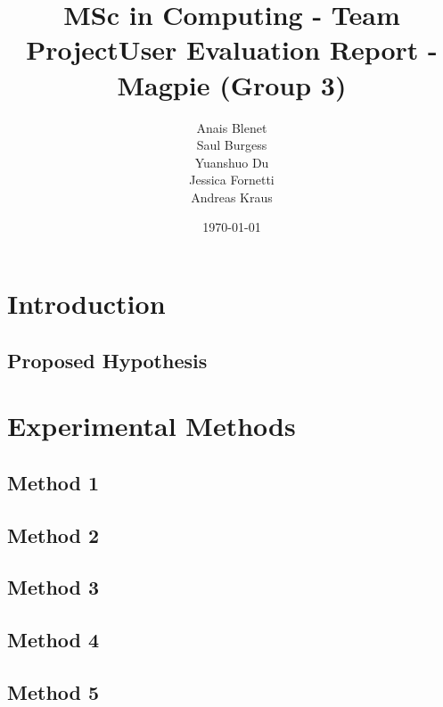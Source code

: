\documentclass{report}
\begin{document}
\title{MSc in Computing - Team Project}
\title{User Evaluation Report - Magpie (Group 3)}
\author{Anais Blenet\\Saul Burgess\\Yuanshuo Du\\Jessica Fornetti\\Andreas Kraus}
\date{\today}

\renewcommand{\cfttoctitlefont}{\hfill\Huge\bfseries} %
\renewcommand{\cftaftertoctitle}{\hfill}

\maketitle %

\tableofcontents
\newpage

\chapter{Introduction}
\section{Proposed Hypothesis}

\chapter{Experimental Methods}
\section{Method 1}
\section{Method 2}
\section{Method 3}
\section{Method 4}
\section{Method 5}
\end{document}
